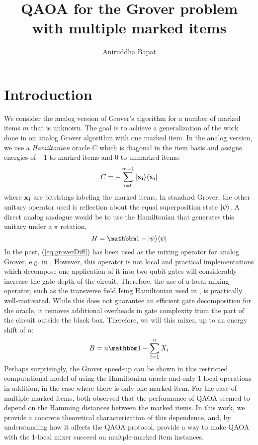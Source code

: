 \documentclass[11pt]{article}
\title{QAOA for the Grover problem with multiple marked items}
\author{Aniruddha Bapat}
\date{}
\begin{document}
\maketitle
\section{Introduction}
We consider the analog version of Grover's algorithm for a number of marked items $m$ that is unknown. The goal is to achieve a generalization of the work done in \cite{Jiang2017, Kato2005} on analog Grover algorithm with one marked item. In the analog version, we use a \emph{Hamiltonian} oracle $C$ which is diagonal in the item basis and assigns energies of $-1$ to marked items and $0$ to unmarked items:
\begin{equation}
  C = -\sum\limits_{i=0}^{m-1}|\mathbf{x_i}\rangle\langle \mathbf{x_i} |
  \label{eq:oracle}
\end{equation}
where $\mathbf{x_i}$ are bitstrings labeling the marked items. In standard Grover, the other unitary operator used is reflection about the equal superposition state $|\psi\rangle$. A direct analog analogue would be to use the Hamiltonian that generates this unitary under a $\pi$ rotation,
\begin{equation}
  H = \id - \ket{\psi}\bra{\psi}
  \label{eq:groverDiff}
\end{equation}
In the past, (\ref{eq:groverDiff}) has been used as the mixing operator for analog Grover, e.g. in \cite{Farhi2000,Roland2003}. However, this operator is not local and practical implementations which decompose one application of it into two-qubit gates will considerably increase the gate depth of the circuit. Therefore, the use of a local mixing operator, such as the transverse field Ising Hamiltonian used in \cite{Jiang2017, Kato2005}, is practically well-motivated. While this does not guarantee an efficient gate decomposition for the oracle, it removes additional overheads in gate complexity from the part of the circuit outside the black box. Therefore, we will this mixer, up to an energy shift of $n$: 
\begin{equation}
  B = n\id - \suml{i=1}{n}{X_i}
  \label{eq:mixer}
\end{equation}
Perhaps surprisingly, the Grover speed-up can be shown in this restricted computational model of using the Hamiltonian oracle and only 1-local operations in addition, in the case where there is only one marked item. For the case of multiple marked items, both \cite{Jiang2017, Kato2005} observed that the performance of QAOA seemed to depend on the Hamming distances between the marked items. In this work, we provide a concrete theoretical characterization of this dependence, and, by understanding how it affects the QAOA protocol, provide a way to make QAOA with the 1-local mixer succeed on multple-marked item instances.
\end{document}
